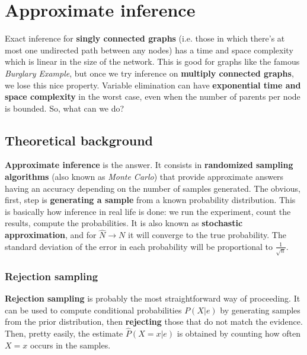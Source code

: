 \section{Approximate inference}
\label{sec:approxinference}
Exact inference for \textbf{singly connected graphs} (i.e. those in which there's at most one undirected path between any nodes) has a time and space complexity which is linear in the size of the network. This is good for graphs like the famous \textit{Burglary Example}, but once we try inference on \textbf{multiply connected graphs}, we lose this nice property. Variable elimination can have \textbf{exponential time and space complexity} in the worst case, even when the number of parents per node is bounded. \cite{russel2010} So, what can we do? 
\subsection{Theoretical background}
\textbf{Approximate inference} is the answer. It consists in \textbf{randomized sampling algorithms} (also known as \textit{Monte Carlo}) that provide approximate answers having an accuracy depending on the number of samples generated. The obvious, first, step is \textbf{generating a sample} from a known probability distribution. This is basically how inference in real life is done: we run the experiment, count the results, compute the probabilities. It is also known as \textbf{stochastic approximation}, and for $\hat{N}\rightarrow N$ it will converge to the true probability. The standard deviation of the error in each probability will be proportional to $\frac{1}{\sqrt{n}}$.
\subsubsection{Rejection sampling}
\textbf{Rejection sampling} is probably the most straightforward way of proceeding. It can be used to compute conditional probabilities $P(X|e)$ by generating samples from the prior distribution, then \textbf{rejecting} those that do not match the evidence. Then, pretty easily, the estimate $\hat{P}(X=x|e)$ is obtained by counting how often $X=x$ occurs in the samples.
